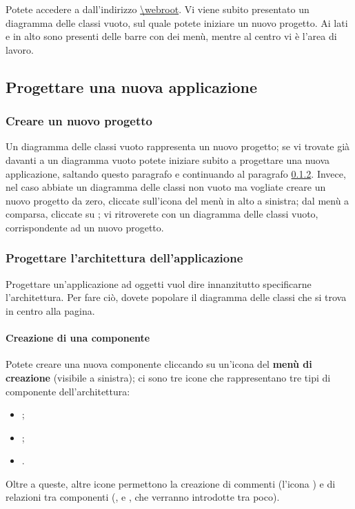 Potete accedere a \proj{} dall'indirizzo \url{\webroot}. Vi viene subito presentato un diagramma delle classi vuoto, sul quale potete iniziare un nuovo progetto. Ai lati e in alto sono presenti delle barre con dei menù, mentre al centro vi è l'area di lavoro.



\subsection{Progettare una nuova applicazione} \label{sec:new}

\subsubsection{Creare un nuovo progetto}
Un diagramma delle classi vuoto rappresenta un nuovo progetto; se vi trovate già davanti a un diagramma vuoto potete iniziare subito a progettare una nuova applicazione, saltando questo paragrafo e continuando al paragrafo \ref{par:arch}. Invece, nel caso abbiate un diagramma delle classi non vuoto ma vogliate creare un nuovo progetto da zero, cliccate sull'icona del menù in alto a sinistra; dal menù a comparsa, cliccate su ; vi ritroverete con un diagramma delle classi vuoto, corrispondente ad un nuovo progetto.

\subsubsection{Progettare l'architettura dell'applicazione} \label{par:arch}
Progettare un'applicazione ad oggetti vuol dire innanzitutto specificarne l'architettura. Per fare ciò, dovete popolare il diagramma delle classi che si trova in centro alla pagina.

\paragraph{Creazione di una componente} Potete creare una nuova componente cliccando su un'icona del \textbf{menù di creazione} (visibile a sinistra); ci sono tre icone che rappresentano tre tipi di componente dell'architettura:
\begin{itemize}
	\item {};
	\item {};
	\item {}.
\end{itemize}
Oltre a queste, altre icone permettono la creazione di commenti (l'icona ) e di relazioni tra componenti (,  e , che verranno introdotte tra poco).

